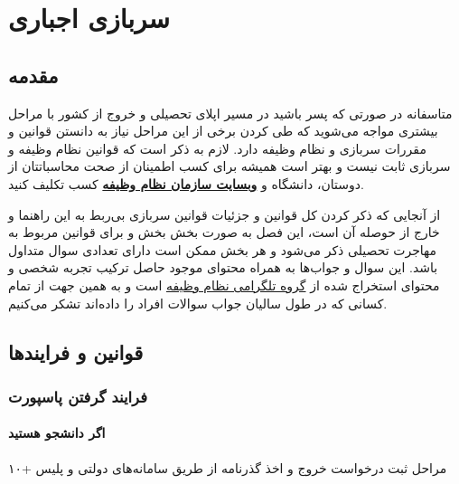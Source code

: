 \chapter{سربازی اجباری}
\label{ch:military-service}

\section{مقدمه}
متاسفانه در صورتی که پسر باشید در مسیر اپلای تحصیلی و خروج از کشور با مراحل بیشتری مواجه می‌شوید که طی کردن برخی از این مراحل
نیاز به دانستن قوانین و مقررات سربازی و نظام وظیفه دارد. لازم به ذکر است که قوانین نظام وظیفه و سربازی ثابت نیست و بهتر است 
همیشه برای کسب اطمینان از صحت محاسباتتان از دوستان، دانشگاه و \href{https://vazifeh.police.ir/}{\textbf{وبسایت سازمان نظام وظیفه}}
 کسب تکلیف کنید. 

از آنجایی که ذکر کردن کل قوانین و جزئیات قوانین سربازی بی‌ربط به این راهنما و خارج از حوصله آن است، این فصل به صورت بخش بخش و برای 
قوانین مربوط به مهاجرت تحصیلی ذکر می‌شود و هر بخش ممکن است دارای تعدادی سوال متداول باشد. این سوال و جواب‌ها به همراه محتوای موجود 
حاصل ترکیب تجربه شخصی و محتوای استخراج شده از \href{https://t.me/joinchat/BlviDUvKluDK9m3p7OpIxQ}{گروه تلگرامی نظام وظیفه} است و به 
همین جهت از تمام کسانی که در طول سالیان جواب سوالات افراد را داده‌اند تشکر می‌کنیم. 

\section{قوانین و فرایند‌ها}


\subsection{فرایند گرفتن پاسپورت}
\subsubsection{اگر دانشجو هستید}
مراحل ثبت درخواست خروج و اخذ گذرنامه از طریق سامانه‌های دولتی و پلیس +۱۰


